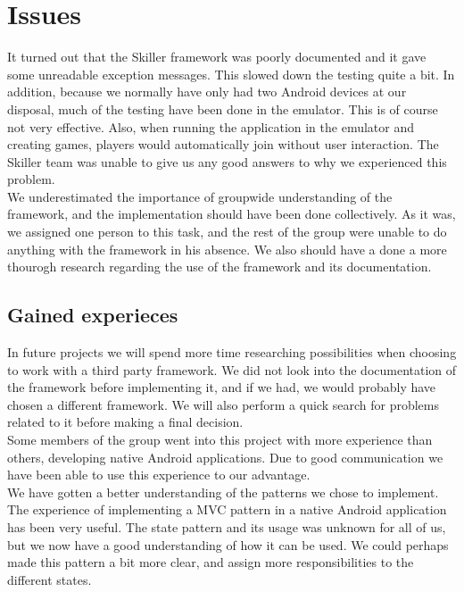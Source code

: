 \section{Issues}


It turned out that the Skiller framework was poorly documented and it gave some unreadable exception messages. This slowed down the testing quite a bit. In addition, because we normally have only had two Android devices at our disposal, much of the testing have been done in the emulator. This is of course not very effective. Also, when running the application in the emulator and creating games, players would automatically join without user interaction. The Skiller team was unable to give us any good answers to why we experienced this problem.\\

We underestimated the importance of groupwide understanding of the framework, and the implementation should have been done collectively. As it was, we assigned one person to this task, and the rest of the group were unable to do anything with the framework in his absence. We also should  have a done a more thourogh research regarding the use of the framework and its documentation. \\

\subsection{Gained experieces}
In future projects we will spend more time researching possibilities when choosing to work with a third party framework. We did not look into the documentation of the framework before implementing it, and if we had, we would probably have chosen a different framework. We will also perform a quick search for problems related to it before making a final decision.  \\

Some members of the group went into this project with more experience than others, developing native Android applications. Due to good communication we have been able to use this experience to our advantage. \\

We have gotten a better understanding of the patterns we chose to implement. The experience of implementing a MVC pattern in a native Android application has been very useful. The state pattern and its usage was unknown for all of us, but we now have a good understanding of how it can be used. We could perhaps made this pattern a bit more clear, and assign more responsibilities to the different states.
